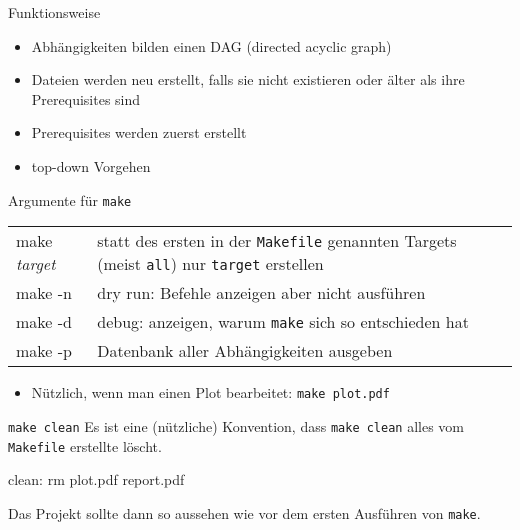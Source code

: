 \begin{frame}{Funktionsweise}
  \begin{center}
  \end{center}

  \begin{itemize}
    \item Abhängigkeiten bilden einen DAG (directed acyclic graph)
    \item Dateien werden neu erstellt, falls sie nicht existieren oder älter als ihre Prerequisites sind
    \item Prerequisites werden zuerst erstellt
    \item top-down Vorgehen
  \end{itemize}
\end{frame}

\begin{frame}[fragile]{Argumente für \texttt{make}}
  \begin{tabu}{>{\ttfamily}l X[,L]}
    make \textit{target} & statt des ersten in der \texttt{Makefile} genannten Targets (meist \texttt{all}) nur \texttt{target} erstellen \\
    make -n              & dry run: Befehle anzeigen aber nicht ausführen \\
    make -d              & debug: anzeigen, warum \texttt{make} sich so entschieden hat \\
    make -p              & Datenbank aller Abhängigkeiten ausgeben
  \end{tabu}
  \begin{itemize}
    \item Nützlich, wenn man einen Plot bearbeitet: \texttt{make plot.pdf}
  \end{itemize}
\end{frame}

\begin{frame}[fragile]{\texttt{make clean}}
  Es ist eine (nützliche) Konvention, dass \texttt{make clean} alles vom \texttt{Makefile} erstellte löscht.

  \vspace{1em}
  \begin{lstmake}
    clean:
        rm plot.pdf report.pdf
  \end{lstmake}
  \vspace{1em}

  Das Projekt sollte dann so aussehen wie vor dem ersten Ausführen von \texttt{make}.
\end{frame}

